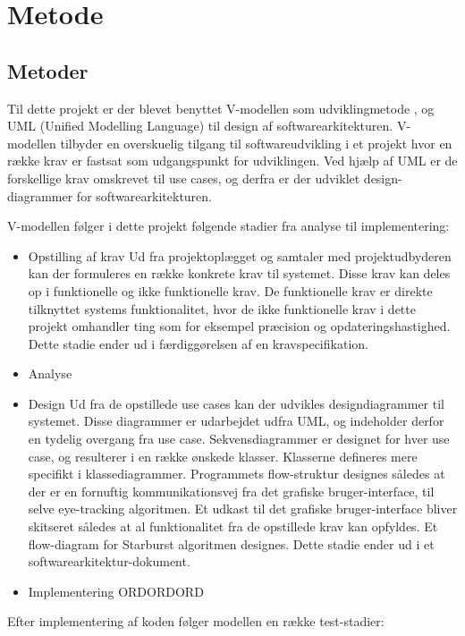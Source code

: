 \documentclass[rapport.tex]{subfiles}
\begin{document}
\section{Metode}
	\subsection{Metoder}
	Til dette projekt er der blevet benyttet V-modellen som udviklingmetode \cite{Vmodel}, og UML (Unified Modelling Language) \cite{UML} til design af softwarearkitekturen. V-modellen tilbyder en overskuelig tilgang til softwareudvikling i et projekt hvor en række krav er fastsat som udgangspunkt for udviklingen. Ved hjælp af UML er de forskellige krav omskrevet til use cases, og derfra er der udviklet design-diagrammer for softwarearkitekturen. 
	
	V-modellen følger i dette projekt følgende stadier fra analyse til implementering:
	\begin{itemize}
		\item Opstilling af krav
		\subitem Ud fra projektoplægget og samtaler med projektudbyderen kan der formuleres en række konkrete krav til systemet. Disse krav kan deles op i funktionelle og ikke funktionelle krav. De funktionelle krav er direkte tilknyttet systems funktionalitet, hvor de ikke funktionelle krav i dette projekt omhandler ting som for eksempel præcision og opdateringshastighed. Dette stadie ender ud i færdiggørelsen af en kravspecifikation. 
		\item Analyse
		\subitem
		\item Design
		\subitem Ud fra de opstillede use cases kan der udvikles designdiagrammer til systemet. Disse diagrammer er udarbejdet udfra UML, og indeholder derfor en tydelig overgang fra use case. Sekvensdiagrammer er designet for hver use case, og resulterer i en række ønskede klasser. Klasserne defineres mere specifikt i klassediagrammer. Programmets flow-struktur designes således at der er en fornuftig kommunikationsvej fra det grafiske bruger-interface, til selve eye-tracking algoritmen. Et udkast til det grafiske bruger-interface bliver skitseret således at al funktionalitet fra de opstillede krav kan opfyldes. Et flow-diagram for Starburst algoritmen designes. Dette stadie ender ud i et softwarearkitektur-dokument. 
		\item Implementering
		\subitem ORDORDORD
	\end{itemize}	
	Efter implementering af koden følger modellen en række test-stadier:
\end{document}
